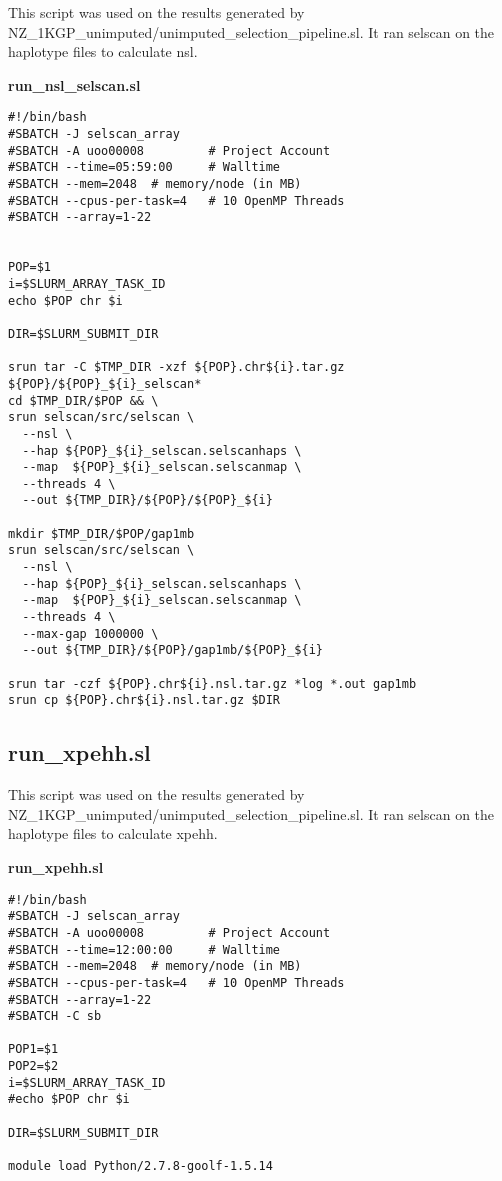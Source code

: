 \documentclass[twoside,openright]{report}
\begin{document}
\begin{appendices}
This script was used on the results generated by
NZ\_1KGP\_unimputed/unimputed\_selection\_pipeline.sl. It ran selscan on
the haplotype files to calculate \gls{nsl}.

\textbf{run\_nsl\_selscan.sl}

\begin{verbatim}
#!/bin/bash
#SBATCH -J selscan_array
#SBATCH -A uoo00008         # Project Account
#SBATCH --time=05:59:00     # Walltime
#SBATCH --mem=2048  # memory/node (in MB)
#SBATCH --cpus-per-task=4   # 10 OpenMP Threads
#SBATCH --array=1-22


POP=$1
i=$SLURM_ARRAY_TASK_ID
echo $POP chr $i

DIR=$SLURM_SUBMIT_DIR

srun tar -C $TMP_DIR -xzf ${POP}.chr${i}.tar.gz ${POP}/${POP}_${i}_selscan* 
cd $TMP_DIR/$POP && \
srun selscan/src/selscan \
  --nsl \
  --hap ${POP}_${i}_selscan.selscanhaps \
  --map  ${POP}_${i}_selscan.selscanmap \
  --threads 4 \
  --out ${TMP_DIR}/${POP}/${POP}_${i}
  
mkdir $TMP_DIR/$POP/gap1mb
srun selscan/src/selscan \
  --nsl \
  --hap ${POP}_${i}_selscan.selscanhaps \
  --map  ${POP}_${i}_selscan.selscanmap \
  --threads 4 \
  --max-gap 1000000 \
  --out ${TMP_DIR}/${POP}/gap1mb/${POP}_${i}
  
srun tar -czf ${POP}.chr${i}.nsl.tar.gz *log *.out gap1mb
srun cp ${POP}.chr${i}.nsl.tar.gz $DIR
\end{verbatim}

\subsection{run\_xpehh.sl}\label{run_xpehh.sl}

This script was used on the results generated by
NZ\_1KGP\_unimputed/unimputed\_selection\_pipeline.sl. It ran selscan on
the haplotype files to calculate \gls{xpehh}.

\textbf{run\_xpehh.sl}

\begin{verbatim}
#!/bin/bash
#SBATCH -J selscan_array
#SBATCH -A uoo00008         # Project Account
#SBATCH --time=12:00:00     # Walltime
#SBATCH --mem=2048  # memory/node (in MB)
#SBATCH --cpus-per-task=4   # 10 OpenMP Threads
#SBATCH --array=1-22
#SBATCH -C sb

POP1=$1
POP2=$2
i=$SLURM_ARRAY_TASK_ID
#echo $POP chr $i

DIR=$SLURM_SUBMIT_DIR

module load Python/2.7.8-goolf-1.5.14


\end{verbatim}
\end{appendices}
\end{document}
